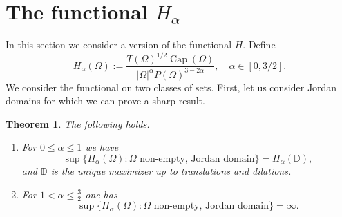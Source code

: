 \documentclass[11pt]{article}
\theoremstyle{plain}
\numberwithin{equation}{section}
\newtheorem{theorem}{Theorem}[section]
\theoremstyle{definition}
\DeclareMathOperator{\cp}{Cap}
\def \Om{\Omega}
\def \mb{\mathbb}
\begin{document}
    \section{The functional $H_\alpha$}
    In this section we consider a version of the functional $H$. Define
    \[
    H_\alpha(\Om):=\frac{T(\Om)^{1/2}\cp(\Om)}{|\Om|^\alpha P(\Om)^{3-2\alpha}},\quad \alpha \in [0,3/2].
    \]
    We consider the functional on two classes of sets. First, let us consider Jordan domains for which we can prove a sharp result.
    \begin{theorem}
        \label{thm:HalphaJordan}
        The following holds.
        \begin{enumerate}
        \item \label{it:halpha1}
        For $0\leq \alpha \leq 1$ we have 
        \[
        \sup\{H_\alpha(\Om): \Om \text{ non-empty, Jordan domain}\}=H_\alpha(\mb D),
        \]
        and $\mb D$ is the unique maximizer up to translations and dilations.
        \item \label{it:halpha2}
        For $1<\alpha \leq \frac32$ one has
        \[
        \sup\{H_\alpha(\Om): \Om \text{ non-empty, Jordan domain}\}=\infty.
        \]
    \end{enumerate}
    \end{theorem}
\end{document}
